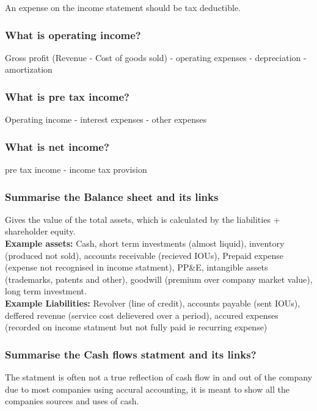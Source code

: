 \documentclass[11pt]{scrartcl} %
\begin{document}
An expense on the income statement should be tax deductible.

\subsubsection{What is operating income?}

Gross profit (Revenue - Cost of goods sold) - operating expenses - depreciation - amortization

\subsubsection{What is pre tax income?}

Operating income - interest expenses - other expenses

\subsubsection{What is net income?}

pre tax income - income tax provision

\subsubsection{Summarise the Balance sheet and its links}

Gives the value of the total assets, which is calculated by the liabilities + shareholder equity.\\

\textbf{Example assets:} Cash, short term investments (almost liquid), inventory (produced not sold), accounts receivable (recieved IOUs), Prepaid expense (expense not recognised in income statment), 
PP\&E, intangible assets (trademarks, patents and other), goodwill (premium over company market value), long term investment.\\

\textbf{Example Liabilities:} Revolver (line of credit), accounts payable (sent IOUs), deffered revenue (service cost delievered over a period), accured expenses (recorded on income 
statment but not fully paid ie recurring expense)

\subsubsection{Summarise the Cash flows statment and its links?}

The statment is often not a true reflection of cash flow in and out of the company due to most companies using accural accounting, it is meant to show all the companies sources and uses of cash.\\
\end{document}

